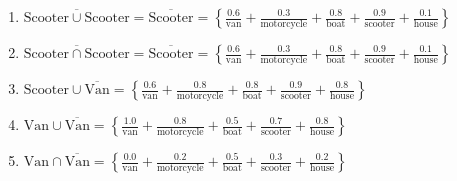 \documentclass{article}
\begin{document}
\begin{enumerate}
\begin{enumerate}
          \item $\overline{\mathrm{Scooter} \cup \mathrm{Scooter}} = \overline{\mathrm{Scooter}}
                  = \boldsymbol{\left\{
                    \frac{0.6}{\mathrm{van}} +
                    \frac{0.3}{\mathrm{motor cycle}} +
                    \frac{0.8}{\mathrm{boat}} +
                    \frac{0.9}{\mathrm{scooter}} +
                    \frac{0.1}{\mathrm{house}}
                    \right\}}$
                \vspace{8pt}

          \item $\overline{\mathrm{Scooter} \cap \mathrm{Scooter}} = \overline{\mathrm{Scooter}}
                  = \boldsymbol{\left\{
                    \frac{0.6}{\mathrm{van}} +
                    \frac{0.3}{\mathrm{motor cycle}} +
                    \frac{0.8}{\mathrm{boat}} +
                    \frac{0.9}{\mathrm{scooter}} +
                    \frac{0.1}{\mathrm{house}}
                    \right\}}$
                \vspace{8pt}

          \item $\mathrm{Scooter} \cup \overline{\mathrm{Van}} = \boldsymbol{\left\{
                    \frac{0.6}{\mathrm{van}} +
                    \frac{0.8}{\mathrm{motor cycle}} +
                    \frac{0.8}{\mathrm{boat}} +
                    \frac{0.9}{\mathrm{scooter}} +
                    \frac{0.8}{\mathrm{house}}
                    \right\}}$
                \vspace{8pt}
          \item $\mathrm{Van} \cup \overline{\mathrm{Van}} = \boldsymbol{\left\{
                    \frac{1.0}{\mathrm{van}} +
                    \frac{0.8}{\mathrm{motor cycle}} +
                    \frac{0.5}{\mathrm{boat}} +
                    \frac{0.7}{\mathrm{scooter}} +
                    \frac{0.8}{\mathrm{house}}
                    \right\}}$
                \vspace{8pt}

          \item $\mathrm{Van} \cap \overline{\mathrm{Van}} = \boldsymbol{\left\{
                    \frac{0.0}{\mathrm{van}} +
                    \frac{0.2}{\mathrm{motor cycle}} +
                    \frac{0.5}{\mathrm{boat}} +
                    \frac{0.3}{\mathrm{scooter}} +
                    \frac{0.2}{\mathrm{house}}
                    \right\}}$
                \vspace{8pt}


\end{enumerate}
\end{enumerate}
\end{document}
